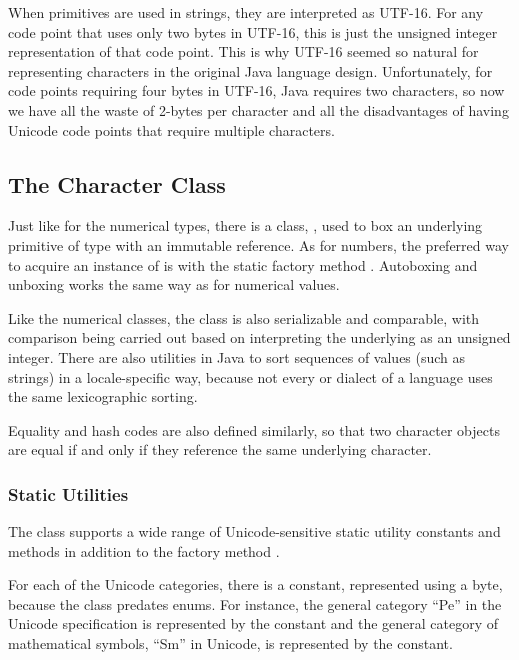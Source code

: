 When  primitives are used in strings, they are interpreted
as UTF-16.  For any code point that uses only two bytes in UTF-16,
this is just the unsigned integer representation of that code point.
This is why UTF-16 seemed so natural for representing characters in
the original Java language design.  Unfortunately, for code points
requiring four bytes in UTF-16, Java requires two characters, so now
we have all the waste of 2-bytes per character and all the
disadvantages of having Unicode code points that require multiple
characters.


\subsection{The Character Class}

Just like for the numerical types, there is a class,
, used to box an underlying primitive
of type  with an immutable reference.  As for numbers, the
preferred way to acquire an instance of  is with the
static factory method .  Autoboxing and
unboxing works the same way as for numerical values.  

Like the numerical classes, the  class is also
serializable and comparable, with comparison being carried out based
on interpreting the underlying  as an unsigned integer.
There are also utilities in Java to sort sequences of 
values (such as strings) in a locale-specific way, because not every
or dialect of a language uses the same lexicographic sorting.

Equality and hash codes are also defined similarly, so that two
character objects are equal if and only if they reference the same
underlying character.

\subsubsection{Static Utilities}

The  class supports a wide range of Unicode-sensitive
static utility constants and methods in addition to the factory method
.

For each of the Unicode categories, there is a constant, represented
using a byte, because the class predates enums.  For instance, the
general category ``Pe'' in the Unicode specification is represented by
the constant  and the general category of
mathematical symbols, ``Sm'' in Unicode, is represented by the
constant.

